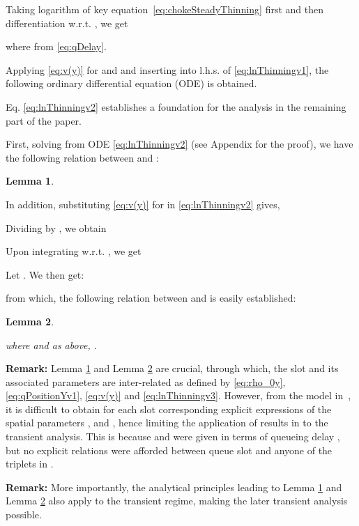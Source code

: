\documentclass{IEEEtran}
\newtheorem{lemma}{Lemma}
\begin{document}
    Taking logarithm of key equation~\eqref{eq:chokeSteadyThinning} first and then differentiation w.r.t. , we get
    
    where  from \eqref{eq:qDelay}.


    Applying \eqref{eq:v(y)} for  and  and inserting into l.h.s. of \eqref{eq:lnThinningv1}, the following ordinary differential equation (ODE) is obtained.


Eq. \eqref{eq:lnThinningv2} establishes a foundation for the analysis in the remaining part of the paper.

First, solving  from ODE \eqref{eq:lnThinningv2} (see Appendix for the proof), we have the following relation between  and :

\begin{lemma}\label{lemma-rho0(y)}
    
\end{lemma}
\vspace{2mm}

    In addition, substituting \eqref{eq:v(y)} for  in \eqref{eq:lnThinningv2} gives,

    Dividing by , we obtain
       
     Upon integrating w.r.t. , we get
       
    Let . We then get:
        
from which, the following relation between  and  is easily established:

\begin{lemma}\label{lemma-y}
    
where  and as above, .
\end{lemma}

{\bf Remark:} Lemma \ref{lemma-rho0(y)} and Lemma \ref{lemma-y} are crucial, through which, the slot and its associated parameters are inter-related as defined by  \eqref{eq:rho_0y},   \eqref{eq:qPositionYv1},  \eqref{eq:v(y)} and  \eqref{eq:lnThinningv3}. However, from the model in~\cite{ChokeToN04}, it is difficult to obtain for each slot  corresponding explicit expressions of the spatial parameters ,  and , hence limiting the application of results in \cite{ChokeToN04} to the transient analysis. This is because  and  were given in terms of queueing delay , but no explicit relations were afforded between queue slot  and anyone of the triplets  in \cite{ChokeToN04}.

{\bf Remark:} More importantly, the analytical principles leading to Lemma \ref{lemma-rho0(y)} and Lemma \ref{lemma-y} also apply to the transient regime, making the later transient analysis possible.
\end{document}
